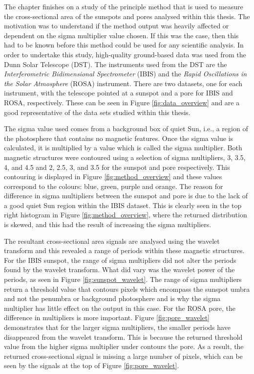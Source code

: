     The chapter finishes on a study of the principle method that is used to measure the cross-sectional area of the sunspots and pores analysed within this thesis.
    The motivation was to understand if the method output was heavily affected or dependent on the sigma multiplier value chosen.
    If this was the case, then this had to be known before this method could be used for any scientific analysis.    
    In order to undertake this study, high-quality ground-based data was used from the Dunn Solar Telescope (DST).
    The instruments used from the DST are the \textit{Interferometric Bidimensional Spectrometer} (IBIS) and the \textit{Rapid Oscillations in the Solar Atmosphere} (ROSA) instrument.
    There are two datasets, one for each instrument, with the telescope pointed at a sunspot and a pore for IBIS and ROSA, respectively.
    These can be seen in Figure \ref{fig:data_overview} and are a good representative of the data sets studied within this thesis.
    
    The sigma value used comes from a background box of quiet Sun, i.e., a region of the photosphere that contains no magnetic features.
    Once the sigma value is calculated, it is multiplied by a value which is called the sigma multiplier.  
    Both magnetic structures were contoured using a selection of sigma multipliers, 3, 3.5, 4, and 4.5 and 2, 2.5, 3, and 3.5 for the sunspot and pore respectively.
    This contouring is displayed in Figure \ref{fig:method_overview} and these values correspond to the colours: blue, green, purple and orange.
    The reason for difference in sigma multipliers between the sunspot and pore is due to the lack of a good quiet Sun region within the IBIS dataset.
    This is clearly seen in the top right histogram in Figure \ref{fig:method_overview}, where the returned distribution is skewed, and this had the result of increasing the sigma multipliers.
    
    The resultant cross-sectional area signals are analysed using the wavelet transform and this revealed a range of periods within these magnetic structures.
    For the IBIS sunspot, the range of sigma multipliers did not alter the periods found by the wavelet transform.
    What did vary was the wavelet power of the periods, as seen in Figure \ref{fig:sunspot_wavelet}. 
    The range of sigma multipliers return a threshold value that contours pixels which encompass the sunspot umbra and not the penumbra or background photosphere and is why the sigma multiplier has little effect on the output in this case.
    For the ROSA pore, the difference in multipliers is more important.
    Figure \ref{fig:pore_wavelet} demonstrates that for the larger sigma multipliers, the smaller periods have disappeared from the wavelet transform. 
    This is because the returned threshold value from the higher sigma multiplier under contours the pore.
    As a result, the returned cross-sectional signal is missing a large number of pixels, which can be seen by the signals at the top of Figure \ref{fig:pore_wavelet}.
  
